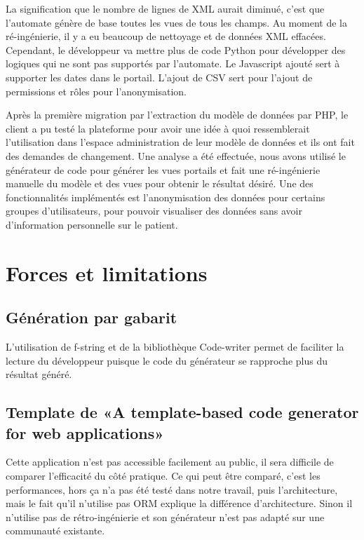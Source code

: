 La signification que le nombre de lignes de XML aurait diminué, c’est que l’automate génère de base toutes les vues de tous les champs. Au moment de la ré-ingénierie, il y a eu beaucoup de nettoyage et de données XML effacées. Cependant, le développeur va mettre plus de code Python pour développer des logiques qui ne sont pas supportés par l’automate. Le Javascript ajouté sert à supporter les dates dans le portail. L’ajout de CSV sert pour l’ajout de permissions et rôles pour l’anonymisation.

Après la première migration par l’extraction du modèle de données par PHP, le client a pu testé la plateforme pour avoir une idée à quoi ressemblerait l’utilisation dans l’espace administration de leur modèle de données et ils ont fait des demandes de changement. Une analyse a été effectuée, nous avons utilisé le générateur de code pour générer les vues portails et fait une ré-ingénierie manuelle du modèle et des vues pour obtenir le résultat désiré. Une des fonctionnalités implémentés est l’anonymisation des données pour certains groupes d’utilisateurs, pour pouvoir visualiser des données sans avoir d’information personnelle sur le patient.

\section{Forces et limitations}

\subsection{Génération par gabarit}

L’utilisation de f-string et de la bibliothèque Code-writer permet de faciliter la lecture du développeur puisque le code du générateur se rapproche plus du résultat généré.

\subsection{Template de «A template-based code generator for web applications»}
Cette application n’est pas accessible facilement au public, il sera difficile de comparer l’efficacité du côté pratique. Ce qui peut être comparé, c’est les performances, hors ça n’a pas été testé dans notre travail, puis l’architecture, mais le fait qu’il n’utilise pas ORM explique la différence d’architecture. Sinon il n’utilise pas de rétro-ingénierie et son générateur n’est pas adapté sur une communauté existante.

